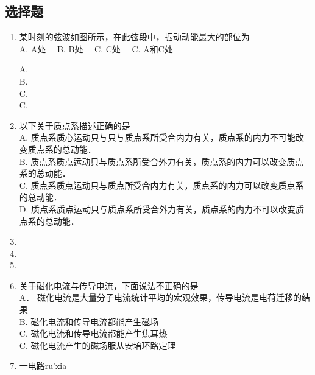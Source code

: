 
\subsection{选择题}
\begin{enumerate}
\item 某时刻的弦波如图所示，在此弦段中，振动动能最大的部位为\\
A. A处$\quad$
B. B处$\quad$
C. C处$\quad$
C. A和C处$\quad$


A. \\
B. \\
C. \\
C. \\

\item 以下关于质点系描述正确的是\\
A. 质点系质心运动只与只与质点系所受合内力有关，质点系的内力不可能改变质点系的总动能．\\
B. 质点系质点运动只与质点系所受合外力有关，质点系的内力可以改变质点系的总动能．\\
C. 质点系质点运动只与质点所受合内力有关，质点系的内力可以改变质点系的总动能．\\
D. 质点系质点运动只与质点系所受合外力有关，质点系的内力不可以改变质点系的总动能．\\
\item 
\item 
\item 
\item 关于磁化电流与传导电流，下面说法不正确的是\\
A． 磁化电流是大量分子电流统计平均的宏观效果，传导电流是电荷迁移的结果\\
B. 磁化电流和传导电流都能产生磁场\\
C. 磁化电流和传导电流都能产生焦耳热\\
C. 磁化电流产生的磁场服从安培环路定理\\
\item 一电路ru'xia
\end{enumerate}